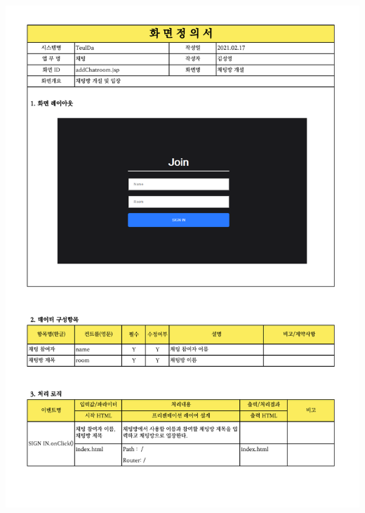 {{{{{{{{{{{{{{{{{{{{{{{{{{{{{{{{{{{{{{{{{{{{{{{{{{{{{{{{{{{{{{{{{{{{{{{{{{{{{{{{{{{{{{\includegraphics[width=20cm]{./Figure/Design/Display/chat/chat_001.pdf} \\
}}}}}}}}}}}}}}}}}}}}}}}}}}}}}}}}}}}}}}}}}}}}}}}}}}}}}}}}}}}}}}}}}}}}}}}}}}}}}}}}}}}}}}
